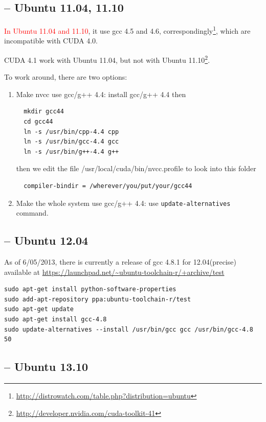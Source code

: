 \subsection{-- Ubuntu 11.04, 11.10}


\textcolor{red}{In Ubuntu 11.04 and 11.10}, it use gcc 4.5 and 4.6,
correspondingly\footnote{\url{http://distrowatch.com/table.php?distribution=ubuntu}},
which are incompatible with CUDA 4.0. 

CUDA 4.1 work with Ubuntu 11.04, but not
with Ubuntu 11.10\footnote{\url{http://developer.nvidia.com/cuda-toolkit-41}}.

To work around, there are two options:
\begin{enumerate}
  \item Make nvcc use gcc/g++ 4.4: install gcc/g++ 4.4 then 
  \begin{verbatim}
  mkdir gcc44
  cd gcc44
  ln -s /usr/bin/cpp-4.4 cpp
  ln -s /usr/bin/gcc-4.4 gcc
  ln -s /usr/bin/g++-4.4 g++
  \end{verbatim}
  then we edit the file /usr/local/cuda/bin/nvcc.profile to look into this
  folder
  \begin{verbatim}
  compiler-bindir = /wherever/you/put/your/gcc44
  \end{verbatim}
  
  \item Make the whole system use gcc/g++ 4.4: use \verb!update-alternatives!
  command.
\end{enumerate}
\subsection{-- Ubuntu 12.04}

As of 6/05/2013, there is currently a release of gcc 4.8.1 for 12.04(precise)
available at \url{https://launchpad.net/~ubuntu-toolchain-r/+archive/test}

\begin{verbatim}
sudo apt-get install python-software-properties
sudo add-apt-repository ppa:ubuntu-toolchain-r/test
sudo apt-get update
sudo apt-get install gcc-4.8
sudo update-alternatives --install /usr/bin/gcc gcc /usr/bin/gcc-4.8 50
\end{verbatim} 


\subsection{-- Ubuntu 13.10}

